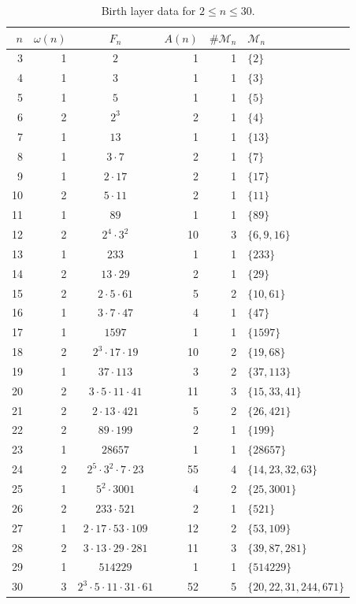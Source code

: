 \documentclass[11pt,letterpaper]{article}
\numberwithin{equation}{section}
\theoremstyle{plain}
\theoremstyle{definition}
\theoremstyle{remark}
\begin{document}
\begin{table}[ht]
\centering
\small
\caption{Birth layer data for $2\le n\le 30$.}
\label{tab:birth-layer-data}
\begin{tabular}{rrcrrl}
\toprule
$n$ & $\omega(n)$ & $F_n$ & $A(n)$ & $\#\mathcal{M}_n$ &
$\mathcal{M}_n$ \\
\midrule
 3 & 1 & $2$ & 1 & 1 & $\{2\}$\\
 4 & 1 & $3$ & 1 & 1 & $\{3\}$\\
 5 & 1 & $5$ & 1 & 1 & $\{5\}$\\
 6 & 2 & $2^3$ & 2 & 1 & $\{4\}$\\
 7 & 1 & $13$ & 1 & 1 & $\{13\}$\\
 8 & 1 & $3\cdot 7$ & 2 & 1 & $\{7\}$\\
 9 & 1 & $2\cdot 17$ & 2 & 1 & $\{17\}$\\
 10 & 2 & $5\cdot 11$ & 2 & 1 & $\{11\}$\\
 11 & 1 & $89$ & 1 & 1 & $\{89\}$\\
 12 & 2 & $2^4\cdot 3^2$ & 10 & 3 & $\{6,9,16\}$\\
 13 & 1 & $233$ & 1 & 1 & $\{233\}$\\
 14 & 2 & $13\cdot 29$ & 2 & 1 & $\{29\}$\\
 15 & 2 & $2\cdot 5\cdot 61$ & 5 & 2 & $\{10,61\}$\\
 16 & 1 & $3\cdot 7\cdot 47$ & 4 & 1 & $\{47\}$\\
 17 & 1 & $1597$ & 1 & 1 & $\{1597\}$\\
 18 & 2 & $2^3\cdot 17\cdot 19$ & 10 & 2 & $\{19,68\}$\\
 19 & 1 & $37\cdot 113$ & 3 & 2 & $\{37,113\}$\\
 20 & 2 & $3\cdot 5\cdot 11\cdot 41$ & 11 & 3 & $\{15,33,41\}$\\
 21 & 2 & $2\cdot 13\cdot 421$ & 5 & 2 & $\{26,421\}$\\
 22 & 2 & $89\cdot 199$ & 2 & 1 & $\{199\}$\\
 23 & 1 & $28657$ & 1 & 1 & $\{28657\}$\\
 24 & 2 & $2^5\cdot 3^2\cdot 7\cdot 23$ & 55 & 4 & $\{14,23,32,63\}$\\
 25 & 1 & $5^2\cdot 3001$ & 4 & 2 & $\{25,3001\}$\\
 26 & 2 & $233\cdot 521$ & 2 & 1 & $\{521\}$\\
 27 & 1 & $2\cdot 17\cdot 53\cdot 109$ & 12 & 2 & $\{53,109\}$\\
 28 & 2 & $3\cdot 13\cdot 29\cdot 281$ & 11 & 3 & $\{39,87,281\}$\\
 29 & 1 & $514229$ & 1 & 1 & $\{514229\}$\\
 30 & 3 & $2^3\cdot 5\cdot 11\cdot 31\cdot 61$ & 52 & 5 &
$\{20,22,31,244,671\}$\\
\bottomrule
\end{tabular}
\end{table}
\end{document}
